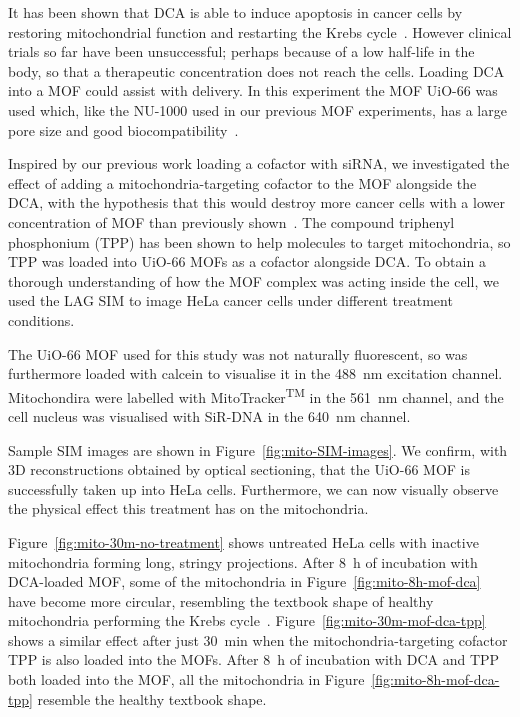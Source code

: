 It has been shown that DCA is able to induce apoptosis in cancer cells by restoring mitochondrial function and restarting the Krebs cycle~\cite{bonnet2007mitochondria}.
However clinical trials so far have been unsuccessful; perhaps because of a low half-life in the body, so that a therapeutic concentration does not reach the cells.
Loading DCA into a MOF could assist with delivery.
In this experiment the MOF UiO-66 was used which, like the NU-1000 used in our previous MOF experiments, has a large pore size and good biocompatibility~\cite{abanades2018mechanistic}.

Inspired by our previous work loading a cofactor with siRNA, we investigated the effect of adding a mitochondria-targeting cofactor to the MOF alongside the DCA, with the hypothesis that this would destroy more cancer cells with a lower concentration of MOF than previously shown~\cite{abanades2018mechanistic}.
The compound triphenyl phosphonium (TPP) has been shown to help molecules to target mitochondria, so TPP was loaded into UiO-66 MOFs as a cofactor alongside DCA.
To obtain a thorough understanding of how the MOF complex was acting inside the cell, we used the LAG SIM to image HeLa cancer cells under different treatment conditions.

The UiO-66 MOF used for this study was not naturally fluorescent, so was furthermore loaded with calcein to visualise it in the \SI{488}{\nano\metre} excitation channel.
Mitochondira were labelled with MitoTracker\textsuperscript{TM} in the \SI{561}{\nano\metre} channel, and the cell nucleus was visualised with SiR-DNA in the \SI{640}{\nano\metre} channel.

Sample SIM images are shown in Figure~\ref{fig:mito-SIM-images}.
We confirm, with 3D reconstructions obtained by optical sectioning, that the UiO-66 MOF is successfully taken up into HeLa cells.
Furthermore, we can now visually observe the physical effect this treatment has on the mitochondria.

Figure~\ref{fig:mito-30m-no-treatment} shows untreated HeLa cells with inactive mitochondria forming long, stringy projections.
After \SI{8}{\hour} of incubation with DCA-loaded MOF, some of the mitochondria in Figure~\ref{fig:mito-8h-mof-dca} have become more circular, resembling the textbook shape of healthy mitochondria performing the Krebs cycle~\cite{murray1993cell}.
Figure~\ref{fig:mito-30m-mof-dca-tpp} shows a similar effect after just \SI{30}{\minute} when the mitochondria-targeting cofactor TPP is also loaded into the MOFs.
After \SI{8}{\hour} of incubation with DCA and TPP both loaded into the MOF, all the mitochondria in Figure~\ref{fig:mito-8h-mof-dca-tpp} resemble the healthy textbook shape.

